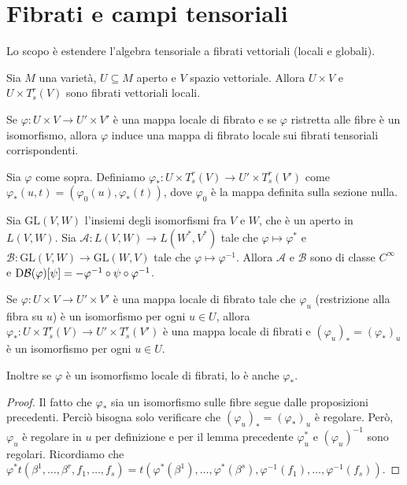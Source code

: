 \section{Fibrati e campi tensoriali}

Lo scopo è estendere l'algebra tensoriale a fibrati vettoriali (locali e globali).


Sia $M$ una varietà, $U\subseteq M$ aperto e $V$ spazio vettoriale. Allora $U\times V$ e $U\times T_s^r(V)$ sono fibrati vettoriali locali.

Se $\varphi:U\times V \to U'\times V'$ è una mappa locale di fibrato e se $\varphi$ ristretta alle fibre è un isomorfismo, allora $\varphi$ induce una mappa di fibrato locale sui fibrati tensoriali corrispondenti.

\begin{definition}
	Sia $\varphi$ come sopra. Definiamo $\varphi_*: U \times T_s^r(V) \to U'\times T_s^r(V')$ come $\varphi_*(u,t) = (\varphi_0(u), \varphi_*(t))$, dove $\varphi_0$ è la mappa definita sulla sezione nulla.
\end{definition}

\begin{lemma}
	Sia $\mathrm {GL} (V,W)$ l'insiemi degli isomorfismi fra $V$ e $W$, che è un aperto in $L(V,W)$. Sia $\mathcal A:L(V,W)\to L(W^*,V^*)$ tale che $\varphi\mapsto \varphi^*$ e $\mathcal B: \mathrm {GL} (V,W) \to \mathrm {GL} (W,V)$ tale che $\varphi \mapsto \varphi^{-1}$. %
	Allora $\mathcal A$ e $\mathcal B$ sono di classe $C^\infty$ e $\mathrm D \mathcal B(\varphi)[\psi] = -\varphi^{-1}\circ\psi\circ\varphi^{-1}$.
\end{lemma}

\begin{proposition}
	Se $\varphi:U\times V\to U'\times V'$ è una mappa locale di fibrato tale che $\varphi_u$ (restrizione alla fibra su $u$) è un isomorfismo per ogni $u\in U$, allora $\varphi_*: U\times T_s^r(V)\to U'\times T_s^r(V')$ è una mappa locale di fibrati e $(\varphi_u)_* = (\varphi_*)_u$ è un isomorfismo per ogni $u\in U$.
	
	Inoltre se $\varphi$ è un isomorfismo locale di fibrati, lo è anche $\varphi_*$.
\end{proposition}

\begin{proof}
	Il fatto che $\varphi_*$ sia un isomorfismo sulle fibre segue dalle proposizioni precedenti. %
	Perciò bisogna solo verificare che $(\varphi_u)_*=(\varphi_*)_u$ è regolare. Però, $\varphi_u$ è regolare in $u$ per definizione e per il lemma precedente $\varphi_u^*$ e $(\varphi_u)^{-1}$ sono regolari.
	Ricordiamo che $\varphi^*t(\beta^1,\dots,\beta^r,f_1,\dots,f_s) = t(\varphi^*(\beta^1),\dots,\varphi^*(\beta^s),\varphi^{-1}(f_1),\dots,\varphi^{-1}(f_s))$. %
\end{proof}






